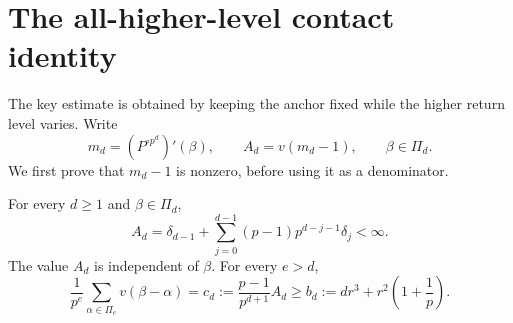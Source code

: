 \section{The all-higher-level contact identity}
\label{sec:contacts}

The key estimate is obtained by keeping the anchor fixed while the
higher return level varies. Write
\[
 m_d=(P^{\circ p^d})'(\beta),\qquad A_d=v(m_d-1),
 \qquad \beta\in\Pi_d.
\]
We first prove that $m_d-1$ is nonzero, before using it as a
denominator.

\begin{proposition}\label{prop:contacts}
For every $d\ge1$ and $\beta\in\Pi_d$,
\begin{equation}\label{eq:multiplier-sum}
 A_d=\delta_{d-1}+
       \sum_{j=0}^{d-1}(p-1)p^{d-j-1}\delta_j<\infty.
\end{equation}
The value $A_d$ is independent of $\beta$. For every $e>d$,
\begin{equation}\label{eq:contact-equality}
 \frac1{p^e}\sum_{\alpha\in\Pi_e}v(\beta-\alpha)
 =c_d:=\frac{p-1}{p^{d+1}}A_d
 \ge b_d:=d r^3+r^2\left(1+\frac1p\right).
\end{equation}
\end{proposition}
